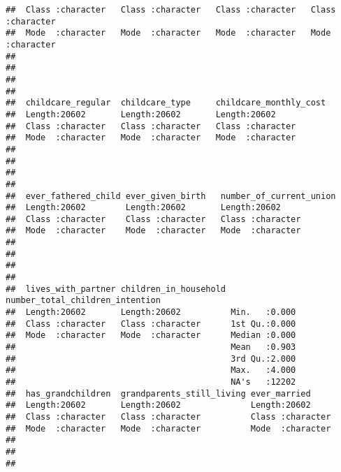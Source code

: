 \documentclass[
]{article}
\begin{document}
\begin{verbatim}
##  Class :character   Class :character   Class :character   Class :character  
##  Mode  :character   Mode  :character   Mode  :character   Mode  :character  
##                                                                             
##                                                                             
##                                                                             
##                                                                             
##  childcare_regular  childcare_type     childcare_monthly_cost
##  Length:20602       Length:20602       Length:20602          
##  Class :character   Class :character   Class :character      
##  Mode  :character   Mode  :character   Mode  :character      
##                                                              
##                                                              
##                                                              
##                                                              
##  ever_fathered_child ever_given_birth   number_of_current_union
##  Length:20602        Length:20602       Length:20602           
##  Class :character    Class :character   Class :character       
##  Mode  :character    Mode  :character   Mode  :character       
##                                                                
##                                                                
##                                                                
##                                                                
##  lives_with_partner children_in_household number_total_children_intention
##  Length:20602       Length:20602          Min.   :0.000                  
##  Class :character   Class :character      1st Qu.:0.000                  
##  Mode  :character   Mode  :character      Median :0.000                  
##                                           Mean   :0.903                  
##                                           3rd Qu.:2.000                  
##                                           Max.   :4.000                  
##                                           NA's   :12202                  
##  has_grandchildren  grandparents_still_living ever_married      
##  Length:20602       Length:20602              Length:20602      
##  Class :character   Class :character          Class :character  
##  Mode  :character   Mode  :character          Mode  :character  
##                                                                 
##                                                                 
##                                                                 

\end{verbatim}
\end{document}
